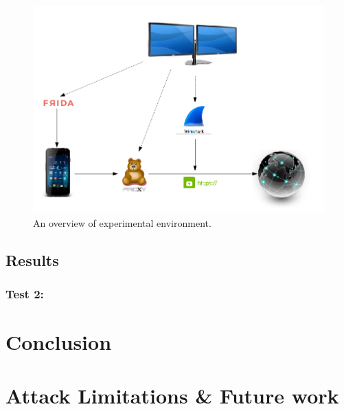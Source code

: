 \documentclass[12pt, a4paper]{report}
\begin{document}
\begin{figure}[h]
  \includegraphics[width=\linewidth]{images/diagram.png}
  \caption{An overview of experimental environment.}
\end{figure}

\clearpage

\section{Results}

\subsection{Test 2: }

\chapter{Conclusion}

\chapter{Attack Limitations \& Future work}
\end{document}
